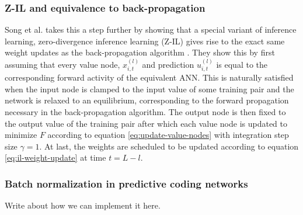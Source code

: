 \documentclass[a4paper,11pt]{article} %
\begin{document}
\subsubsection{Z-IL and equivalence to back-propagation}
Song et al. takes this a step further by showing that a special variant of inference learning, zero-divergence inference learning (Z-IL) gives rise to the exact same weight updates as the back-propagation algorithm \cite{PredictiveCodingNetworks}. They show this by first assuming that every value node, $x_{i,t}^{(l)}$ and prediction $u_{i,t}^{(l)}$ is equal to the corresponding forward activity of the equivalent ANN. This is naturally satisfied when the input node is clamped to the input value of some training pair and the network is relaxed to an equilibrium, corresponding to the forward propagation necessary in the back-propagation algorithm. The output node is then fixed to the output value of the training pair after which each value node is updated to minimize $F$ according to equation \ref{eq:update-value-nodes} with integration step size $\gamma = 1$. At last, the weights are scheduled to be updated according to equation \ref{eq:il-weight-update} at time $t=L-l$.

\subsubsection{Batch normalization in predictive coding networks}
Write about how we can implement it here.
\end{document}

